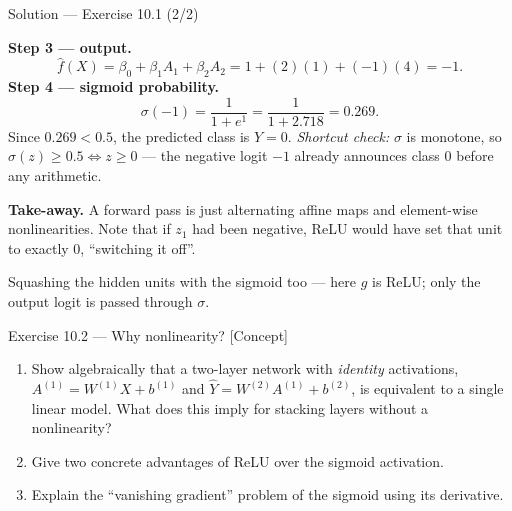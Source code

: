\documentclass[aspectratio=169,11pt]{beamer}
\begin{document}
\begin{frame}{Solution --- Exercise 10.1 (2/2)}
\begin{solutionbox}
  \textbf{Step 3 --- output.}
  \[
    \hat f(X) = \beta_0 + \beta_1 A_1 + \beta_2 A_2
             = 1 + (2)(1) + (-1)(4) = -1 .
  \]
  \textbf{Step 4 --- sigmoid probability.}
  \[
    \sigma(-1) = \frac{1}{1 + e^{1}} = \frac{1}{1 + 2.718} = 0.269 .
  \]
  Since $0.269 < 0.5$, the predicted class is $Y = 0$.
  \emph{Shortcut check:} $\sigma$ is monotone, so
  $\sigma(z) \ge 0.5 \iff z \ge 0$ --- the negative logit $-1$ already
  announces class $0$ before any arithmetic.

  \medskip
  \textbf{Take-away.} A forward pass is just alternating affine maps
  and element-wise nonlinearities. Note that if $z_1$ had been
  negative, ReLU would have set that unit to exactly $0$, ``switching
  it off''.

\end{solutionbox}
\begin{mistake}
  Squashing the hidden units with the sigmoid too --- here $g$ is ReLU; only the
  output logit is passed through $\sigma$.
\end{mistake}
\end{frame}

\begin{frame}{Exercise 10.2 --- Why nonlinearity? [Concept]}
\begin{exercise}
  \begin{enumerate}
    \item Show algebraically that a two-layer network with
          \emph{identity} activations,
          $A^{(1)} = W^{(1)} X + b^{(1)}$ and
          $\hat Y = W^{(2)} A^{(1)} + b^{(2)}$, is equivalent to a
          single linear model. What does this imply for stacking
          layers without a nonlinearity?
    \item Give two concrete advantages of ReLU over the sigmoid
          activation.
    \item Explain the ``vanishing gradient'' problem of the sigmoid
          using its derivative.
  \end{enumerate}
\end{exercise}
\end{frame}
\end{document}
